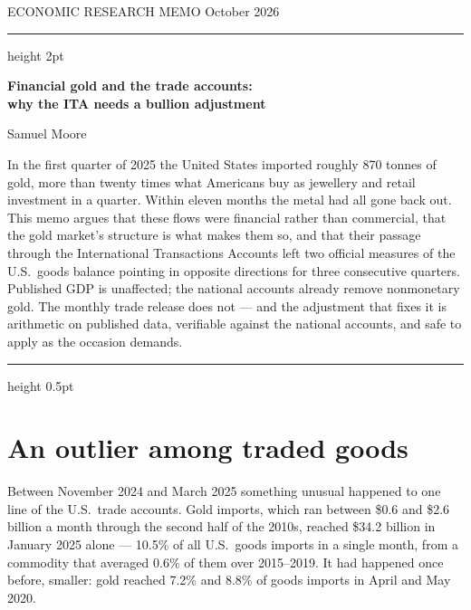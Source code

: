 \documentclass[11pt]{article}
\begin{document}
\pagestyle{empty}

{\sffamily\footnotesize\color{soft} ECONOMIC RESEARCH MEMO \hfill October 2026}

\vspace{4pt}
{\color{rule}\hrule height 2pt}
\vspace{10pt}

{\sffamily\bfseries\LARGE\color{ink}
Financial gold and the trade accounts:\\ why the ITA needs a bullion adjustment\par}

\vspace{6pt}
{\sffamily\small\color{soft} Samuel Moore\par}

\vspace{10pt}

{\sffamily\small\color{ink}
In the first quarter of 2025 the United States imported roughly 870 tonnes of
gold, more than twenty times what Americans buy as jewellery and retail
investment in a quarter. Within eleven months the metal had all gone back out.
This memo argues that these flows were financial rather than commercial, that
the gold market's structure is what makes them so, and that their passage
through the International Transactions Accounts left two official measures of
the U.S.\ goods balance pointing in opposite directions for three consecutive
quarters. Published GDP is unaffected; the national accounts already remove
nonmonetary gold. The monthly trade release does not --- and the adjustment
that fixes it is arithmetic on published data, verifiable against the national
accounts, and safe to apply as the occasion demands.\par}

\vspace{6pt}
{\color{rule}\hrule height 0.5pt}

\section{An outlier among traded goods}

Between November 2024 and March 2025 something unusual happened to one line of
the U.S.\ trade accounts. Gold imports, which ran between \$0.6 and \$2.6
billion a month through the second half of the 2010s, reached \$34.2 billion in
January 2025 alone --- 10.5\% of all U.S.\ goods imports in a single month, from
a commodity that averaged 0.6\% of them over 2015--2019. It had happened once
before, smaller: gold reached 7.2\% and 8.8\% of goods imports in April and May
2020.
\end{document}
